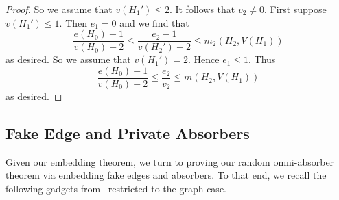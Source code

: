 \documentclass[11pt]{article}
\def\COMMENT#1{}
\numberwithin{equation}{section}
\newcounter{i}
\theoremstyle{plain}
\newtheorem{proposition}[thm]{Proposition}
\theoremstyle{plain} %
\theoremstyle{definition}
\begin{document}
\begin{proof}
So we assume that $v(H_1')\le 2$. It follows that $v_2 \ne 0$. First suppose $v(H_1')\le 1$. Then $e_1=0$ and we find that
$$\frac{e(H_0)-1}{v(H_0)-2} \le \frac{e_2-1}{v(H_2')-2} \le m_2(H_2,V(H_1))$$
as desired. So we assume that $v(H_1')=2$. Hence $e_1\le 1$. Thus
$$\frac{e(H_0)-1}{v(H_0)-2} \le \frac{e_2}{v_2} \le m(H_2,V(H_1))$$
as desired.
\end{proof}

\subsection{Fake Edge and Private Absorbers}

Given our embedding theorem, we turn to proving our random omni-absorber theorem via embedding fake edges and absorbers. To that end, we recall the following gadgets from~\cite{DPI} restricted to the graph case.
\end{document}
